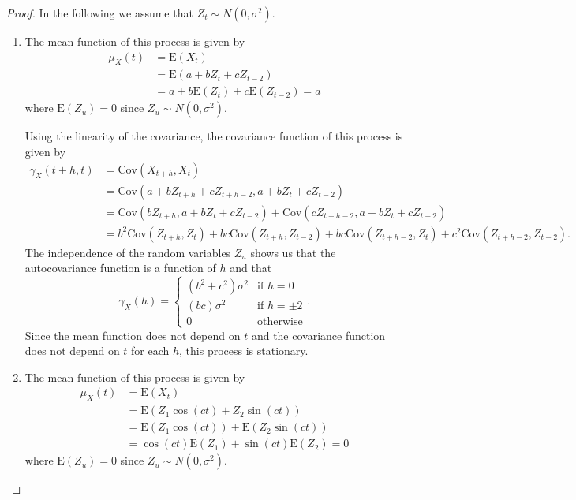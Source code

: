 \documentclass[12pt]{article}
\theoremstyle{definition}
\newcommand{\E}{\text{E}}
\newcommand{\Co}[2]{\text{Cov}({#1}, {#2})}
\newcommand{\mx}[1][t]{\mu_X({#1})}
\newcommand{\gx}[2]{\gamma_X({#1}, {#2})}
\begin{document}
\begin{proof}
  In the following we assume that $Z_t \sim N(0, \sigma^2)$.
  \begin{enumerate}
    \item The mean function of this process is given by
      \begin{align*}
        \mx &= \E(X_t) \\
        &= \E(a + bZ_t + cZ_{t-2}) \\
        &= a + b\E(Z_t) + c\E(Z_{t-2}) = a
      \end{align*}
      where $\E(Z_u) = 0$ since $Z_u \sim N(0, \sigma^2)$.

      Using the linearity of the covariance, the covariance function of this
      process is given by
      \begin{align*}
        \gx{t+h}{t} &= \Co{X_{t+h}}{X_t} \\
        &= \Co{a + bZ_{t + h} + cZ_{t + h - 2}} {a + bZ_t + cZ_{t-2}} \\
        &= \Co{bZ_{t + h}} {a + bZ_t + cZ_{t-2}} + \Co{cZ_{t + h - 2}} {a + bZ_t + cZ_{t-2}} \\
        &= b^2 \Co{Z_{t+h}}{Z_t} + bc\Co{Z_{t+h}}{Z_{t-2}} + bc\Co{Z_{t+h-2}}{Z_{t}} + c^2 \Co{Z_{t+h-2}}{Z_{t-2}}.
      \end{align*}
      The independence of the random variables $Z_u$ shows us that the autocovariance
      function is a function of $h$ and that
      \[
        \gamma_X(h) =
        \begin{cases}
          (b^2 + c^2)\sigma^2 & \text{if $h=0$}\\
          (bc)\sigma^2 & \text{if $h = \pm 2$} \\
          0 & \text{otherwise}
        \end{cases}.
      \]
      Since the mean function does not depend on $t$ and the covariance function does not depend on $t$
      for each $h$, this process is stationary.
    \item The mean function of this process is given by
      \begin{align*}
        \mx &= \E(X_t) \\
        &= \E(Z_1 \cos(ct)+ Z_2 \sin(ct))\\
        &= \E(Z_1 \cos(ct))+ \E(Z_2 \sin(ct)) \\
        &= \cos(ct)\E(Z_1)+ \sin(ct)\E(Z_2) = 0
      \end{align*}
      where $\E(Z_u) = 0$ since $Z_u \sim N(0, \sigma^2)$.


\end{enumerate}
\end{proof}
\end{document}
